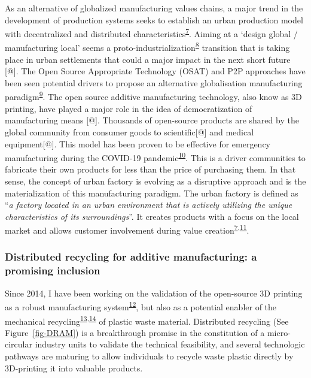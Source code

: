 \documentclass[
  11pt,
  a4paperpaper,
  onecolumn]{article}
\begin{document}
As an alternative of globalized manufacturing values chains, a major
trend in the development of production systems seeks to establish an
urban production model with decentralized and distributed
characteristics\textsuperscript{\protect\hyperlink{ref-Herrmann2020}{7}}.
Aiming at a `design global / manufacturing local' seems a
proto-industrialization\textsuperscript{\protect\hyperlink{ref-sabel1985}{8}}
transition that is taking place in urban settlements that could a major
impact in the next short future {[}@{]}. The Open Source Appropriate
Technology (OSAT) and P2P approaches have been seen potential drivers to
propose an alternative globalisation manufacturing
paradigm\textsuperscript{\protect\hyperlink{ref-Heikkinen2020a}{9}}. The
open source additive manufacturing technology, also know as 3D printing,
have played a major role in the idea of democratization of manufacturing
means {[}@{]}. Thousands of open-source products are shared by the
global community from consumer goods to scientific{[}@{]} and medical
equipment{[}@{]}. This model has been proven to be effective for
emergency manufacturing during the COVID-19
pandemic\textsuperscript{\protect\hyperlink{ref-Pearce2020a}{10}}. This
is a driver communities to fabricate their own products for less than
the price of purchasing them. In that sense, the concept of urban
factory is evolving as a disruptive approach and is the materialization
of this manufacturing paradigm. The urban factory is defined as
``\emph{a factory located in an urban environment that is actively
utilizing the unique characteristics of its surroundings}''. It creates
products with a focus on the local market and allows customer
involvement during value
creation\textsuperscript{\protect\hyperlink{ref-Herrmann2020}{7},\protect\hyperlink{ref-Ijassi2022}{11}}.

\hypertarget{distributed-recycling-for-additive-manufacturing-a-promising-inclusion}{%
\subsubsection{Distributed recycling for additive manufacturing: a
promising
inclusion}\label{distributed-recycling-for-additive-manufacturing-a-promising-inclusion}}

Since 2014, I have been working on the validation of the open-source 3D
printing as a robust manufacturing
system\textsuperscript{\protect\hyperlink{ref-CruzSanchez2014}{12}}, but
also as a potential enabler of the mechanical
recycling\textsuperscript{\protect\hyperlink{ref-Cruz2015}{13},\protect\hyperlink{ref-CruzSanchez2017}{14}}
of plastic waste material. Distributed recycling (See
Figure~\ref{fig-DRAM}) is a breakthrough promise in the constitution of
a micro-circular industry units to validate the technical feasibility,
and several technologic pathways are maturing to allow individuals to
recycle waste plastic directly by 3D-printing it into valuable products.
\end{document}
